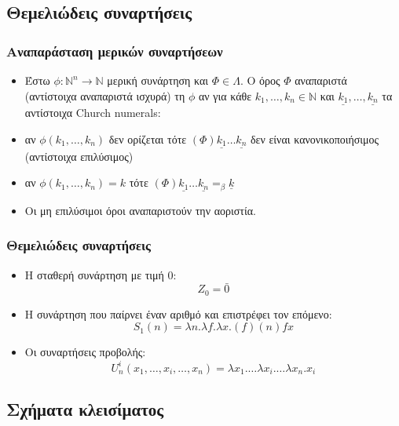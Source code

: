 \documentclass{beamer}
\begin{document}
\subsection{Θεμελιώδεις συναρτήσεις}
\begin{frame}
        \frametitle{Αναπαράσταση μερικών συναρτήσεων}
        \begin{itemize}
                \item Έστω $\phi : \mathbb{N}^n \rightarrow \mathbb{N}$ μερική συνάρτηση και $\Phi \in \Lambda $. O όρος $\Phi$ αναπαριστά (αντίστοιχα αναπαριστά ισχυρά) τη $\phi$ αν για κάθε $k_1,\ldots, k_n \in \mathbb{N}$ και $ \underline{k_1}, \ldots, \underline{k_n}$ τα αντίστοιχα Church numerals: \pause
                \item  αν $\phi(k_1,\ldots,k_n)$ δεν ορίζεται τότε $(\Phi) \underline{k_1} \ldots \underline{k_n}$ δεν είναι κανονικοποιήσιμος (αντίστοιχα επιλύσιμος) \pause
                \item  αν $\phi(k_1,\ldots,k_n) = k$ τότε $(\Phi) \underline{k_1} \ldots \underline{k_n} =_\beta \underline{k}$ 
                \pause
                \item Οι μη επιλύσιμοι όροι αναπαριστούν την αοριστία.
               
        \end{itemize}
\end{frame}




\begin{frame}
        \frametitle{Θεμελιώδεις συναρτήσεις}
        \begin{itemize}
                \item Η σταθερή συνάρτηση με τιμή 0:
                	$$Z_0=\bar{0}$$
                \pause
                \item Η συνάρτηση που παίρνει έναν αριθμό και επιστρέφει τον επόμενο:
                	$$S_1(n)=\lambda n . \lambda f . \lambda x . (f) (n) f x$$
                \pause
                \item Οι συναρτήσεις προβολής: $$U^i_n(x_1,\ldots,x_i,\ldots,x_n)= \lambda x_1 . \ldots \lambda x_i . \ldots \lambda x_n . x_i$$
        \end{itemize}
\end{frame}
\subsection{Σχήματα κλεισίματος}
\end{document}
